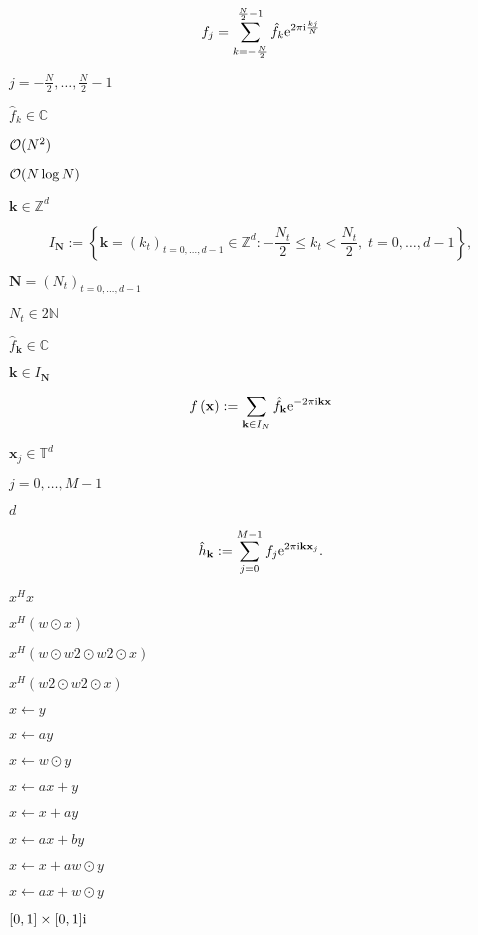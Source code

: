 \documentclass{article}
\begin{document}
\[ f_j= \sum_{k=-\frac{N}{2}}^{\frac{N}{2}-1} \hat{f}_{k} {\rm e}^{2\pi{\rm i}\frac{kj}{N}} \]
\pagebreak

$j=-\frac{N}{2},\hdots,\frac{N}{2}-1$
\pagebreak

$\hat{f}_{k}\in\mathbb{C}$
\pagebreak

${\cal O}(N^2)$
\pagebreak

${\cal O}(N\log N)$
\pagebreak

$\mathbf{k}\in\mathbb{Z}^d$
\pagebreak

\[ I_{\mathbf{N}} := \left\{ \mathbf{k}=\left(k_t\right)_{t=0,\hdots,d-1} \in \mathbb{Z}^d: - \frac{N_t}{2} \le k_t < \frac{N_t}{2} ,\;t=0,\hdots,d-1\right\}, \]
\pagebreak

$\mathbf{N}=\left(N_t\right)_{t=0,\hdots,d-1}$
\pagebreak

$N_t\in 2\mathbb{N}$
\pagebreak

$\hat f_{\mathbf{k}} \in \mathbb{C}$
\pagebreak

$\mathbf{k}\in I_{\mathbf{N}}$
\pagebreak

\[ f\left(\mathbf{x}\right) := \sum_{ \mathbf{k}\in I_{ N}} \hat{f}_{\mathbf{ k}} {\rm e}^{-2\pi{\rm i}\mathbf{k}\mathbf{ x}} \]
\pagebreak

$\mathbf{x}_j \in \mathbb{T}^d$
\pagebreak

$j=0,\ldots, M-1$
\pagebreak

$ d$
\pagebreak

\[ \hat h_{\mathbf{k}} := \sum_{j=0}^{M-1} {f}_{j} {\rm e}^{2\pi{\rm i}\mathbf{k}\mathbf{ x}_j}. \]
\pagebreak

$x^H x$
\pagebreak

$x^H (w \odot x)$
\pagebreak

$x^H (w\odot w2\odot w2 \odot x)$
\pagebreak

$x^H (w2\odot w2 \odot x)$
\pagebreak

$x \leftarrow y$
\pagebreak

$x \leftarrow a y$
\pagebreak

$x \leftarrow w\odot y$
\pagebreak

$x \leftarrow a x + y$
\pagebreak

$x \leftarrow x + a y$
\pagebreak

$x \leftarrow a x + b y$
\pagebreak

$x \leftarrow x + a w\odot y$
\pagebreak

$x \leftarrow a x + w\odot y$
\pagebreak

$[0,1]\times[0,1]{\rm i}$
\pagebreak
\end{document}
